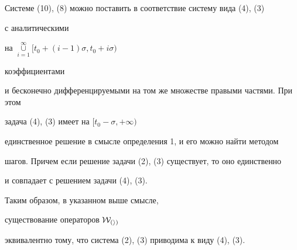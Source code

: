 Системе (10), (8) можно поставить в соответствие систему вида (4), (3)


с аналитическими


на $\mathop{\cup}\limits_{i=1}^{\infty}{[t_0+(i-1)\sigma, t_0+i\sigma)}$


коэффициентами


и бесконечно дифференцируемыми на том же множестве правыми частями. При этом


задача (4), (3) имеет на $[t_0-\sigma, +\infty)$


единственное решение в смысле определения 1, и его можно найти методом


шагов. Причем если решение задачи (2), (3) существует, то оно единственно


и совпадает с решением задачи (4), (3).





Таким образом, в указанном выше смысле, 


существование операторов $\cal W_{(i)}$


эквивалентно тому, что система (2), (3) приводима к виду (4), (3).





